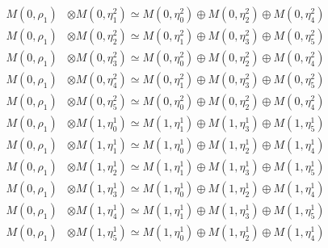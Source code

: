 \begin{align*}
M(0,\rho_{1}) &\otimes M(0,\eta^{2}_{1}) \simeq M(0,\eta^{2}_{0}) \oplus M(0,\eta^{2}_{2}) \oplus M(0,\eta^{2}_{4}) \\
M(0,\rho_{1}) &\otimes M(0,\eta^{2}_{2}) \simeq M(0,\eta^{2}_{1}) \oplus M(0,\eta^{2}_{3}) \oplus M(0,\eta^{2}_{5}) \\
M(0,\rho_{1}) &\otimes M(0,\eta^{2}_{3}) \simeq M(0,\eta^{2}_{0}) \oplus M(0,\eta^{2}_{2}) \oplus M(0,\eta^{2}_{4}) \\
M(0,\rho_{1}) &\otimes M(0,\eta^{2}_{4}) \simeq M(0,\eta^{2}_{1}) \oplus M(0,\eta^{2}_{3}) \oplus M(0,\eta^{2}_{5}) \\
M(0,\rho_{1}) &\otimes M(0,\eta^{2}_{5}) \simeq M(0,\eta^{2}_{0}) \oplus M(0,\eta^{2}_{2}) \oplus M(0,\eta^{2}_{4}) \\
M(0,\rho_{1}) &\otimes M(1,\eta^{1}_{0}) \simeq M(1,\eta^{1}_{1}) \oplus M(1,\eta^{1}_{3}) \oplus M(1,\eta^{1}_{5}) \\
M(0,\rho_{1}) &\otimes M(1,\eta^{1}_{1}) \simeq M(1,\eta^{1}_{0}) \oplus M(1,\eta^{1}_{2}) \oplus M(1,\eta^{1}_{4}) \\
M(0,\rho_{1}) &\otimes M(1,\eta^{1}_{2}) \simeq M(1,\eta^{1}_{1}) \oplus M(1,\eta^{1}_{3}) \oplus M(1,\eta^{1}_{5}) \\
M(0,\rho_{1}) &\otimes M(1,\eta^{1}_{3}) \simeq M(1,\eta^{1}_{0}) \oplus M(1,\eta^{1}_{2}) \oplus M(1,\eta^{1}_{4}) \\
M(0,\rho_{1}) &\otimes M(1,\eta^{1}_{4}) \simeq M(1,\eta^{1}_{1}) \oplus M(1,\eta^{1}_{3}) \oplus M(1,\eta^{1}_{5}) \\
M(0,\rho_{1}) &\otimes M(1,\eta^{1}_{5}) \simeq M(1,\eta^{1}_{0}) \oplus M(1,\eta^{1}_{2}) \oplus M(1,\eta^{1}_{4}) \\
\end{align*}

